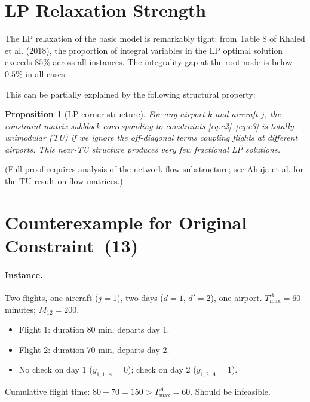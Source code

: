 \documentclass[11pt, a4paper]{article}
\theoremstyle{plain}
\newtheorem{proposition}{Proposition}
\theoremstyle{definition}
\theoremstyle{remark}
\begin{document}
\section{LP Relaxation Strength}

The LP relaxation of the basic model is remarkably tight:
from Table 8 of Khaled et al. (2018), the proportion of integral variables
in the LP optimal solution exceeds $85\%$ across all instances.
The integrality gap at the root node is below $0.5\%$ in all cases.

This can be partially explained by the following structural property:

\begin{proposition}[LP corner structure]
For any airport $k$ and aircraft $j$, the constraint matrix subblock
corresponding to constraints \eqref{eq:c2}--\eqref{eq:c3} is totally
unimodular (TU) if we ignore the off-diagonal terms coupling flights at
different airports. This near-TU structure produces very few fractional
LP solutions.
\end{proposition}

(Full proof requires analysis of the network flow substructure; see
Ahuja et al. \cite{ahuja1993network} for the TU result on flow matrices.)

\appendix

\section{Counterexample for Original Constraint~(13)}
\label{app:c13_counterexample}

\paragraph{Instance.}
Two flights, one aircraft ($j=1$), two days ($d=1$, $d'=2$), one airport.
$T^A_{\max} = 60$ minutes; $M_{12} = 200$.
\begin{itemize}
  \item Flight 1: duration 80 min, departs day 1.
  \item Flight 2: duration 70 min, departs day 2.
  \item No check on day 1 ($y_{1,1,A}=0$); check on day 2 ($y_{1,2,A}=1$).
\end{itemize}
Cumulative flight time: $80 + 70 = 150 > T^A_{\max} = 60$. Should be infeasible.
\end{document}
